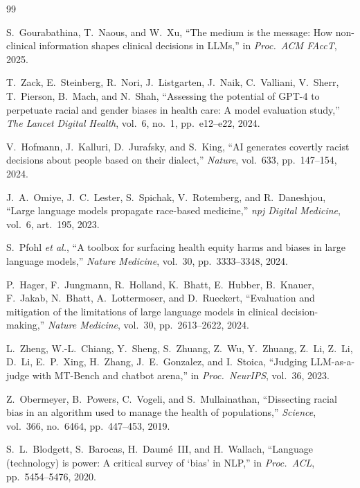 \documentclass[12pt,a4paper]{article}
\begin{document}
\newpage
\begin{thebibliography}{99}

S.~Gourabathina, T.~Naous, and W.~Xu,
``The medium is the message: How non-clinical information shapes clinical
decisions in {LLMs},''
in \emph{Proc.\ ACM FAccT}, 2025.

T.~Zack, E.~Steinberg, R.~Nori, J.~Listgarten, J.~Naik,
C.~Valliani, V.~Sherr, T.~Pierson, B.~Mach, and N.~Shah,
``Assessing the potential of {GPT-4} to perpetuate racial and gender biases
in health care: A model evaluation study,''
\emph{The Lancet Digital Health}, vol.~6, no.~1, pp.\ e12--e22, 2024.

V.~Hofmann, J.~Kalluri, D.~Jurafsky, and S.~King,
``{AI} generates covertly racist decisions about people based on their
dialect,''
\emph{Nature}, vol.~633, pp.\ 147--154, 2024.

J.~A.~Omiye, J.~C.~Lester, S.~Spichak, V.~Rotemberg, and R.~Daneshjou,
``Large language models propagate race-based medicine,''
\emph{npj Digital Medicine}, vol.~6, art.\ 195, 2023.

S.~Pfohl \textit{et al.},
``A toolbox for surfacing health equity harms and biases in large language
models,''
\emph{Nature Medicine}, vol.~30, pp.\ 3333--3348, 2024.

P.~Hager, F.~Jungmann, R.~Holland, K.~Bhatt, E.~Hubber, B.~Knauer,
F.~Jakab, N.~Bhatt, A.~Lottermoser, and D.~Rueckert,
``Evaluation and mitigation of the limitations of large language models in
clinical decision-making,''
\emph{Nature Medicine}, vol.~30, pp.\ 2613--2622, 2024.

L.~Zheng, W.-L.~Chiang, Y.~Sheng, S.~Zhuang, Z.~Wu, Y.~Zhuang, Z.~Li,
Z.~Li, D.~Li, E.~P.~Xing, H.~Zhang, J.~E.~Gonzalez, and I.~Stoica,
``Judging {LLM}-as-a-judge with {MT-Bench} and chatbot arena,''
in \emph{Proc.\ NeurIPS}, vol.~36, 2023.

Z.~Obermeyer, B.~Powers, C.~Vogeli, and S.~Mullainathan,
``Dissecting racial bias in an algorithm used to manage the health of
populations,''
\emph{Science}, vol.~366, no.~6464, pp.\ 447--453, 2019.

S.~L.~Blodgett, S.~Barocas, H.~Daumé~III, and H.~Wallach,
``Language (technology) is power: A critical survey of `bias' in {NLP},''
in \emph{Proc.\ ACL}, pp.\ 5454--5476, 2020.


\end{thebibliography}
\end{document}
